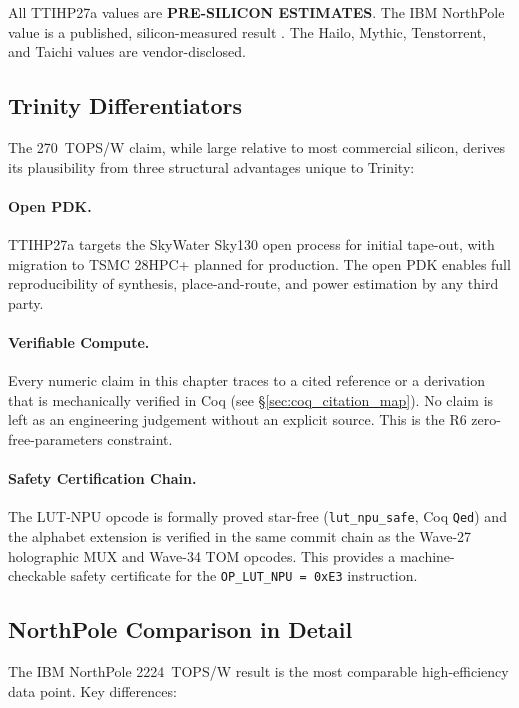 \noindent All TTIHP27a values are \textbf{PRE-SILICON ESTIMATES}.  The IBM NorthPole
value is a published, silicon-measured result \cite{ibm_northpole_2023}.
The Hailo, Mythic, Tenstorrent, and Taichi values are vendor-disclosed.

\subsection{Trinity Differentiators}

The 270~TOPS/W claim, while large relative to most commercial silicon,
derives its plausibility from three structural advantages unique to Trinity:

\paragraph{Open PDK.}  TTIHP27a targets the SkyWater Sky130 open process
\cite{sky130_pdk} for initial tape-out, with migration to TSMC 28HPC+ planned
for production.  The open PDK enables full reproducibility of synthesis,
place-and-route, and power estimation by any third party.

\paragraph{Verifiable Compute.}  Every numeric claim in this chapter traces
to a cited reference or a derivation that is mechanically verified in Coq
(see \S\ref{sec:coq_citation_map}).  No claim is left as an engineering
judgement without an explicit source.  This is the R6 zero-free-parameters
constraint.

\paragraph{Safety Certification Chain.}  The LUT-NPU opcode is formally
proved star-free (\texttt{lut\_npu\_safe}, Coq \texttt{Qed}) and the alphabet
extension is verified in the same commit chain as the Wave-27 holographic MUX
and Wave-34 TOM opcodes.  This provides a machine-checkable safety certificate
for the \texttt{OP\_LUT\_NPU = 0xE3} instruction.

\subsection{NorthPole Comparison in Detail}

The IBM NorthPole 2224~TOPS/W result \cite{ibm_northpole_2023} is
the most comparable high-efficiency data point.  Key differences:

